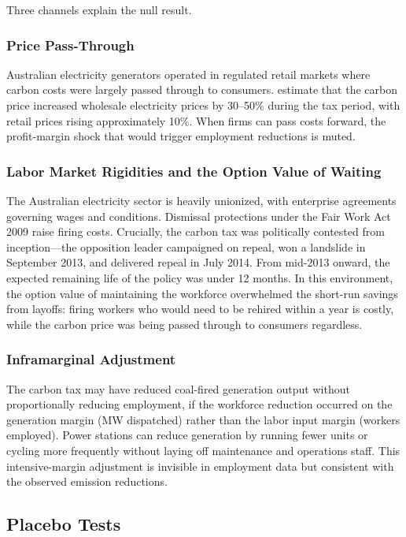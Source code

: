 \documentclass[12pt]{article}
\begin{document}
Three channels explain the null result.

\subsubsection*{Price Pass-Through} Australian electricity generators operated in regulated retail markets where carbon costs were largely passed through to consumers. \citet{ogorman2014impact} estimate that the carbon price increased wholesale electricity prices by 30--50\% during the tax period, with retail prices rising approximately 10\%. When firms can pass costs forward, the profit-margin shock that would trigger employment reductions is muted.

\subsubsection*{Labor Market Rigidities and the Option Value of Waiting} The Australian electricity sector is heavily unionized, with enterprise agreements governing wages and conditions. Dismissal protections under the Fair Work Act 2009 raise firing costs. Crucially, the carbon tax was politically contested from inception---the opposition leader campaigned on repeal, won a landslide in September 2013, and delivered repeal in July 2014. From mid-2013 onward, the expected remaining life of the policy was under 12 months. In this environment, the option value of maintaining the workforce overwhelmed the short-run savings from layoffs: firing workers who would need to be rehired within a year is costly, while the carbon price was being passed through to consumers regardless.

\subsubsection*{Inframarginal Adjustment} The carbon tax may have reduced coal-fired generation output without proportionally reducing employment, if the workforce reduction occurred on the generation margin (MW dispatched) rather than the labor input margin (workers employed). Power stations can reduce generation by running fewer units or cycling more frequently without laying off maintenance and operations staff. This intensive-margin adjustment is invisible in employment data but consistent with the observed emission reductions.

\subsection{Placebo Tests}
\end{document}
